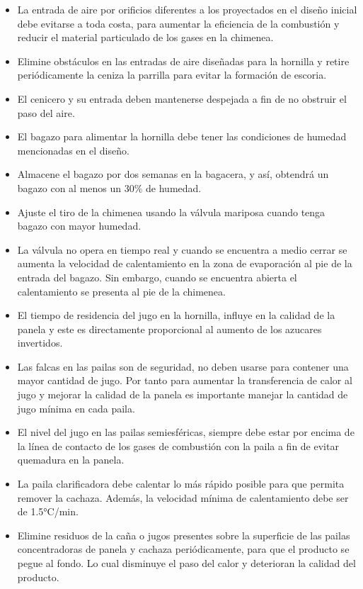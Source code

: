 \documentclass{article}%
\begin{document}
\begin{large}
\begin{itemize}
\begin{itemize}
\item%
La entrada de aire por orificios diferentes a los proyectados en el diseño inicial debe evitarse a toda costa, para aumentar la eficiencia de la combustión y reducir el material particulado de los gases en la chimenea.%
\item%
Elimine obstáculos en las entradas de aire diseñadas para la hornilla y retire periódicamente la ceniza la parrilla para evitar la formación de escoria.%
\item%
El cenicero y su entrada deben mantenerse despejada a fin de no obstruir el paso del aire.%
\item%
El bagazo para alimentar la hornilla debe tener las condiciones de humedad mencionadas en el diseño.%
\item%
Almacene el bagazo por dos semanas en la bagacera, y así, obtendrá un bagazo con al menos un 30\% de humedad.%
\item%
Ajuste el tiro de la chimenea usando la válvula mariposa cuando tenga bagazo con mayor humedad.%
\item%
La válvula no opera en tiempo real y cuando se encuentra a medio cerrar se aumenta la velocidad de calentamiento en la zona de evaporación al pie de la entrada del bagazo. Sin embargo, cuando se encuentra abierta el calentamiento se presenta al pie de la chimenea.%
\item%
El tiempo de residencia del jugo en la hornilla, influye en la calidad de la panela y este es directamente proporcional al aumento de los azucares invertidos.%
\item%
Las falcas en las pailas son de seguridad, no deben usarse para contener una mayor cantidad de jugo. Por tanto para aumentar la transferencia de calor al jugo y mejorar la calidad de la panela es importante manejar la cantidad de jugo mínima en cada paila.%
\item%
El nivel del jugo en las pailas semiesféricas, siempre debe estar por encima de la línea de contacto de los gases de combustión con la paila a fin de evitar quemadura en la panela.%
\item%
La paila clarificadora debe calentar lo más rápido posible para que permita remover la cachaza. Además, la velocidad mínima de calentamiento debe ser de 1.5°C/min.%
\item%
Elimine residuos de la caña o jugos presentes sobre la superficie de las pailas concentradoras de panela y cachaza periódicamente, para que el producto se pegue al fondo. Lo cual disminuye el paso del calor y deterioran la calidad del producto.%

\end{itemize}
\end{itemize}
\end{large}
\end{document}
